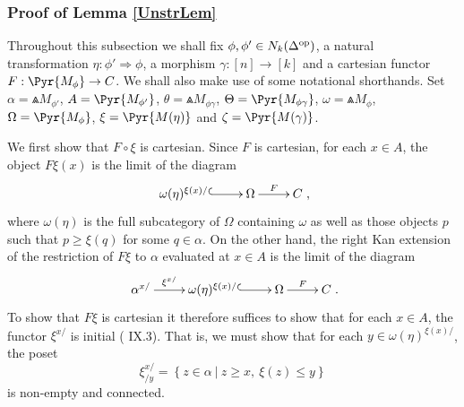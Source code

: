 \documentclass[a4paper]{article}
\numberwithin{equation}{section}
\begin{document}
\subsubsection{Proof of Lemma \ref{UnstrLem}}
\label{ProofUnstr}

Throughout this subsection we shall fix $\phi, \phi' \in N_k(\Delta^{\rm op})$, a natural transformation $\eta: \phi' \Rightarrow \phi$, a morphism $\gamma:[n] \to [k]$ and a cartesian functor $F: \Pyr{M_\phi} \to C$. We shall also make use of some notational shorthands. Set $\alpha= \Wedge{M_{\phi'}}$, $A=\Pyr{M_{\phi'}}$, $\theta = \Wedge{M_{\phi\gamma}}$, $\Theta=\Pyr{M_{\phi \gamma}}$, $\omega = \Wedge{M_\phi}$, $\Omega = \Pyr{M_\phi}$, $\xi=\Pyr{M(\eta)}$ and $\zeta=\Pyr{M(\gamma)}$.

We first show that $F \circ \xi$ is cartesian. Since $F$ is cartesian, for each $x \in A$, the object $F\xi(x)$ is the limit of the diagram
\begin{equation*}
 \xymatrix{ \omega(\eta)^{\xi(x)/} \ar@{^{(}->}[r] & \Omega \ar[r]^-F & C},
\end{equation*}
where $\omega(\eta)$ is the full subcategory of $\Omega$ containing $\omega$ as well as those objects $p$ such that $p \geq \xi(q)$ for some $q \in \alpha$. On the other hand, the right Kan extension of the restriction of $F \xi$ to $\alpha$ evaluated at $x \in A$ is the limit of the diagram
\begin{equation*}
 \xymatrix{ \alpha^{x/} \ar[r]^-{\xi^{x/}} & \omega(\eta)^{\xi(x)/} \ar@{^{(}->}[r] & \Omega \ar[r]^-F & C}.
\end{equation*}
To show that $F \xi$ is cartesian it therefore suffices to show that for each $x \in A$, the functor $\xi^{x/}$ is initial (\cite{MacLane} IX.3). That is, we must show that for each $y \in \omega(\eta)^{\xi(x)/}$, the poset
\begin{equation*}
 \xi^{x/}_{/y} = \left\{ z \in \alpha \ | \ z \geq x, \ \xi(z) \leq y \right\}
\end{equation*}
is non-empty and connected. 
\end{document}
